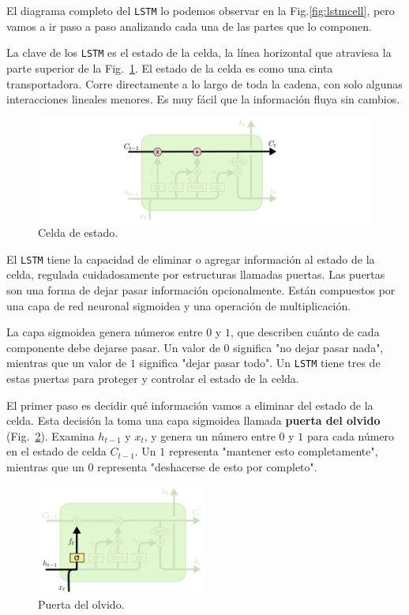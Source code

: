\documentclass[a4paper,12pt]{article}
\begin{document}
El diagrama completo del \texttt{LSTM} lo podemos observar en la Fig.\ref{fig:lstmcell}, pero vamos a ir paso a paso analizando cada una de las partes que lo componen.

La clave de los \texttt{LSTM} es el estado de la celda, la línea horizontal que atraviesa la parte superior de la Fig.~\ref{fig:lstm1}. El estado de la celda es como una cinta transportadora. Corre directamente a lo largo de toda la cadena, con solo algunas interacciones lineales menores. Es muy fácil que la información fluya sin cambios.

\begin{figure}[H]
	\begin{center}				
		\includegraphics[width=1\textwidth]{lstm1.png}
		\caption{Celda de estado. \citep{olahlstm}}
		\label{fig:lstm1}
	\end{center}
\end{figure}

El \texttt{LSTM} tiene la capacidad de eliminar o agregar información al estado de la celda, regulada cuidadosamente por estructuras llamadas puertas. Las puertas son una forma de dejar pasar información opcionalmente. Están compuestos por una capa de red neuronal sigmoidea y una operación de multiplicación.

La capa sigmoidea genera números entre $0$ y $1$, que describen cuánto de cada componente debe dejarse pasar. Un valor de $0$ significa "no dejar pasar nada", mientras que un valor de $1$ significa "dejar pasar todo". Un \texttt{LSTM} tiene tres de estas puertas para proteger y controlar el estado de la celda.

El primer paso es decidir qué información vamos a eliminar del estado de la celda. Esta decisión la toma una capa sigmoidea llamada \textbf{puerta del olvido} (Fig.~\ref{fig:lstm2}). Examina $h_{t-1}$ y $x_t$, y genera un número entre $0$ y $1$ para cada número en el estado de celda $C_{t-1}$. Un $1$ representa "mantener esto completamente", mientras que un $0$ representa "deshacerse de esto por completo".

\begin{figure}[H]
	\begin{center}				
		\includegraphics[width=0.5\textwidth]{lstm2.png}
		\caption{Puerta del olvido. \citep{olahlstm}}
		\label{fig:lstm2}
	\end{center}
\end{figure}
\end{document}
